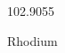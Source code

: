\documentclass[12pt]{article}
\begin{document}
\hfill{}
\vfill
\begin{center}
  {\fontsize{50}{60}
  }

  \vspace{1em}

  102.9055

Rhodium
\end{center}
\vfill
\end{document}
